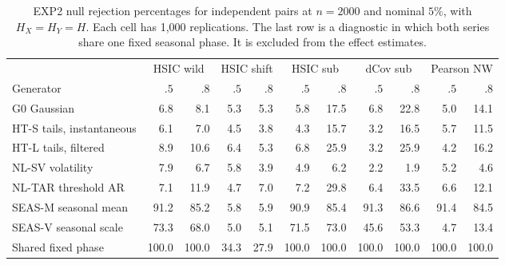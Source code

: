 \documentclass[11pt]{article}
\theoremstyle{remark}
\begin{document}
\begin{table}[H]
\centering\footnotesize
\setlength{\tabcolsep}{4pt}
\caption{EXP2 null rejection percentages for independent pairs at $n=2000$ and nominal $5\%$, with $H_X=H_Y=H$. Each cell has 1,000 replications. The last row is a diagnostic in which both series share one fixed seasonal phase. It is excluded from the effect estimates.}\label{tab:exp2}
\begin{tabular}{@{}lrrrrrrrrrr@{}}
\toprule
& \multicolumn{2}{c}{HSIC wild} & \multicolumn{2}{c}{HSIC shift} & \multicolumn{2}{c}{HSIC sub} & \multicolumn{2}{c}{dCov sub} & \multicolumn{2}{c}{Pearson NW} \\
\cmidrule(lr){2-3}\cmidrule(lr){4-5}\cmidrule(lr){6-7}\cmidrule(lr){8-9}\cmidrule(l){10-11}
Generator & $.5$ & $.8$ & $.5$ & $.8$ & $.5$ & $.8$ & $.5$ & $.8$ & $.5$ & $.8$ \\
\midrule
G0 Gaussian & 6.8 & 8.1 & 5.3 & 5.3 & 5.8 & 17.5 & 6.8 & 22.8 & 5.0 & 14.1 \\
HT-S tails, instantaneous & 6.1 & 7.0 & 4.5 & 3.8 & 4.3 & 15.7 & 3.2 & 16.5 & 5.7 & 11.5 \\
HT-L tails, filtered & 8.9 & 10.6 & 6.4 & 5.3 & 6.8 & 25.9 & 3.2 & 25.9 & 4.2 & 16.2 \\
NL-SV volatility & 7.9 & 6.7 & 5.8 & 3.9 & 4.9 & 6.2 & 2.2 & 1.9 & 5.2 & 4.6 \\
NL-TAR threshold AR & 7.1 & 11.9 & 4.7 & 7.0 & 7.2 & 29.8 & 6.4 & 33.5 & 6.6 & 12.1 \\
SEAS-M seasonal mean & 91.2 & 85.2 & 5.8 & 5.9 & 90.9 & 85.4 & 91.3 & 86.6 & 91.4 & 84.5 \\
SEAS-V seasonal scale & 73.3 & 68.0 & 5.0 & 5.1 & 71.5 & 73.0 & 45.6 & 53.3 & 4.7 & 13.4 \\
\midrule
Shared fixed phase & 100.0 & 100.0 & 34.3 & 27.9 & 100.0 & 100.0 & 100.0 & 100.0 & 100.0 & 100.0 \\
\bottomrule
\end{tabular}
\end{table}
\end{document}
